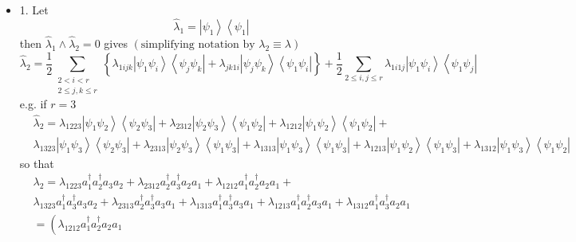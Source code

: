 \documentclass[aps,preprint]{revtex4}%
\begin{document}
\begin{itemize}
\item 1. Let
\begin{equation}
\hat{\lambda}_{1}=\left\vert \psi_{1}\right\rangle \left\langle \psi
_{1}\right\vert
\end{equation}
then $\hat{\lambda}_{1}\wedge\hat{\lambda}_{2}=0$ gives $\left(
\text{simplifying notation by }\lambda_{2}\equiv\lambda\right)  $
\begin{equation}
\hat{\lambda}_{2}=\frac{1}{2}\sum_{\substack{2<i<r\\2\leq j,k\leq r}}\left\{
\lambda_{1ijk}\left\vert \psi_{1}\psi_{i}\right\rangle \left\langle \psi
_{j}\psi_{k}\right\vert +\lambda_{jk1i}\left\vert \psi_{j}\psi_{k}%
\right\rangle \left\langle \psi_{1}\psi_{i}\right\vert \right\}  +\frac{1}%
{2}\sum_{2\leq i,j\leq r}\lambda_{1i1j}\left\vert \psi_{1}\psi_{i}%
\right\rangle \left\langle \psi_{1}\psi_{j}\right\vert
\end{equation}
e.g. if $r=3$
\begin{align}
&  \hat{\lambda}_{2}=\lambda_{1223}\left\vert \psi_{1}\psi_{2}\right\rangle
\left\langle \psi_{2}\psi_{3}\right\vert +\lambda_{2312}\left\vert \psi
_{2}\psi_{3}\right\rangle \left\langle \psi_{1}\psi_{2}\right\vert
+\lambda_{1212}\left\vert \psi_{1}\psi_{2}\right\rangle \left\langle \psi
_{1}\psi_{2}\right\vert +\nonumber\\
&  \lambda_{1323}\left\vert \psi_{1}\psi_{3}\right\rangle \left\langle
\psi_{2}\psi_{3}\right\vert +\lambda_{2313}\left\vert \psi_{2}\psi
_{3}\right\rangle \left\langle \psi_{1}\psi_{3}\right\vert +\lambda
_{1313}\left\vert \psi_{1}\psi_{3}\right\rangle \left\langle \psi_{1}\psi
_{3}\right\vert +\lambda_{1213}\left\vert \psi_{1}\psi_{2}\right\rangle
\left\langle \psi_{1}\psi_{3}\right\vert +\lambda_{1312}\left\vert \psi
_{1}\psi_{3}\right\rangle \left\langle \psi_{1}\psi_{2}\right\vert
\end{align}
so that
\begin{align}
&  \lambda_{2}=\lambda_{1223}a_{1}^{\dagger}a_{2}^{\dagger}a_{3}a_{2}%
+\lambda_{2312}a_{2}^{\dagger}a_{3}^{\dagger}a_{2}a_{1}+\lambda_{1212}%
a_{1}^{\dagger}a_{2}^{\dagger}a_{2}a_{1}+\nonumber\\
&  \lambda_{1323}a_{1}^{\dagger}a_{3}^{\dagger}a_{3}a_{2}+\lambda_{2313}%
a_{2}^{\dagger}a_{3}^{\dagger}a_{3}a_{1}+\lambda_{1313}a_{1}^{\dagger}%
a_{3}^{\dagger}a_{3}a_{1}+\lambda_{1213}a_{1}^{\dagger}a_{2}^{\dagger}%
a_{3}a_{1}+\lambda_{1312}a_{1}^{\dagger}a_{3}^{\dagger}a_{2}a_{1}\nonumber\\
&  =\left(  \lambda_{1212}a_{1}^{\dagger}a_{2}^{\dagger}a_{2}a_{1}%

\end{align}
\end{itemize}
\end{document}
